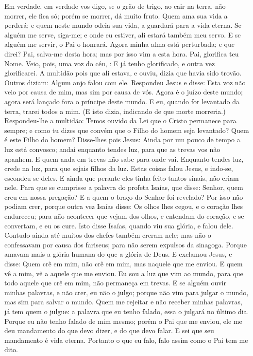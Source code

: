 {  Em verdade, em verdade vos digo, se o grão de trigo, ao cair na terra, não morrer, ele fica só; porém se morrer, dá muito fruto.
  Quem ama sua vida a perderá; e quem neste mundo odeia sua vida, a guardará para a vida eterna.
  Se alguém me serve, siga-me; e onde eu estiver, ali estará também meu servo. E se alguém me servir, o Pai o honrará.
  Agora minha alma está perturbada; e que direi? Pai, salva-me desta hora; mas por isso vim a esta hora.
  Pai, glorifica teu Nome. Veio, pois, uma voz do céu,
{} : E já
{} tenho glorificado, e outra vez
{} glorificarei.
  A multidão pois que ali estava, e
{} ouviu, dizia que havia sido trovão. Outros diziam: Algum anjo falou com ele.
  Respondeu Jesus e disse: Esta voz não veio por causa de mim, mas sim por causa de vós.
  Agora é o juízo deste mundo; agora será lançado fora o príncipe deste mundo.
  E eu, quando for levantado da terra, trarei todos a mim.
  (E isto dizia, indicando de que morte
{} morreria.)
  Respondeu-lhe a multidão: Temos ouvido da Lei que o Cristo permanece para sempre; e como tu dizes que convém que o Filho do homem seja levantado? Quem é este Filho do homem?
  Disse-lhes pois Jesus: Ainda por um pouco de tempo a luz está convosco; andai enquanto tendes luz, para que as trevas vos não apanhem. E quem anda em trevas não sabe para onde vai.
  Enquanto tendes luz, crede na luz, para que sejais filhos da luz. Estas coisas falou Jesus, e indo-se, escondeu-se deles.
  E ainda que perante eles tinha feito tantos sinais, não criam nele.
  Para que se cumprisse a palavra do profeta Isaías, que disse: Senhor, quem creu em nossa pregação? E a quem o braço do Senhor foi revelado?
  Por isso não podiam crer, porque outra vez Isaías disse:
  Os olhos lhes cegou, e o coração lhes endureceu; para não acontecer que vejam dos olhos, e entendam do coração, e se convertam, e eu os cure.
  Isto disse Isaías, quando viu sua glória, e falou dele.
  Contudo ainda até muitos dos chefes também creram nele; mas não o confessavam por causa dos fariseus; para não serem expulsos da sinagoga.
  Porque amavam mais a glória humana do que a glória de Deus.
  E exclamou Jesus, e disse: Quem crê em mim, não crê
{} em mim, mas
{} naquele que me enviou.
  E quem vê a mim, vê a aquele que me enviou.
  Eu sou a luz que vim ao mundo, para que todo aquele que crê em mim, não permaneça em trevas.
  E se alguém ouvir minhas palavras, e não crer, eu não o julgo; porque não vim para julgar o mundo, mas sim para salvar o mundo.
  Quem me rejeitar e não receber minhas palavras, já tem quem o julgue: a palavra que eu tenho falado, essa o julgará no último dia.
  Porque eu não tenho falado de mim mesmo; porém o Pai que me enviou, ele me deu mandamento do que devo dizer, e do que devo falar.
  E sei que seu mandamento é vida eterna. Portanto o que eu falo, falo assim como o Pai tem me dito.
\par }

